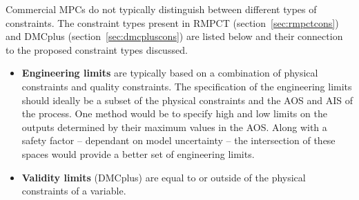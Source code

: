 Commercial MPCs do not typically distinguish between different types of constraints.
The constraint types present in RMPCT (section~\ref{sec:rmpctcons}) and DMCplus (section~\ref{sec:dmcpluscons}) are listed below and their connection to the proposed constraint types discussed.
\begin{itemize}
  \item {\bf Engineering limits} are typically based on a combination of physical constraints and quality constraints.
  The specification of the engineering limits should ideally be a subset of the physical constraints and the AOS and AIS of the process.
  One method would be to specify high and low limits on the outputs determined by their maximum values in the AOS.
  Along with a safety factor -- dependant on model uncertainty -- the intersection of these spaces would provide a better set of engineering limits.
  \item {\bf Validity limits} (DMCplus) are equal to or outside of the physical constraints of a variable.
\end{itemize}



